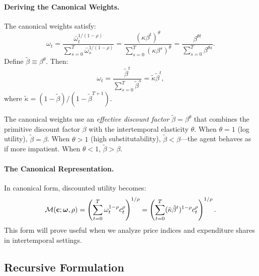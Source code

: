 \paragraph{Deriving the Canonical Weights.}
The canonical weights satisfy:
\begin{equation}
\omega_t = \frac{\bar{\omega}_t^{1/(1-\rho)}}{\sum_{s=0}^{T} \bar{\omega}_s^{1/(1-\rho)}} = \frac{(\kappa \beta^t)^{\theta}}{\sum_{s=0}^{T} (\kappa \beta^s)^{\theta}} = \frac{\beta^{\theta t}}{\sum_{s=0}^{T} \beta^{\theta s}}.
\label{eq:canonical-weights}
\end{equation}
Define $\tilde{\beta} \equiv \beta^\theta$. Then:
\begin{equation}
\omega_t = \frac{\tilde{\beta}^t}{\sum_{s=0}^{T} \tilde{\beta}^s} = \tilde{\kappa} \tilde{\beta}^t,
\label{eq:canonical-weights-simple}
\end{equation}
where $\tilde{\kappa} = (1 - \tilde{\beta})/(1 - \tilde{\beta}^{T+1})$.

\begin{calloutnote}
The canonical weights use an \emph{effective discount factor} $\tilde{\beta} = \beta^\theta$ that combines the primitive discount factor $\beta$ with the intertemporal elasticity $\theta$. When $\theta = 1$ (log utility), $\tilde{\beta} = \beta$. When $\theta > 1$ (high substitutability), $\tilde{\beta} < \beta$---the agent behaves as if more impatient. When $\theta < 1$, $\tilde{\beta} > \beta$.
\end{calloutnote}

\paragraph{The Canonical Representation.}
In canonical form, discounted utility becomes:
\begin{equation}
\mathcal{M}(\mathbf{c}; \boldsymbol{\omega}, \rho) = \left( \sum_{t=0}^{T} \omega_t^{1-\rho} c_t^\rho \right)^{1/\rho} = \left( \sum_{t=0}^{T} (\tilde{\kappa} \tilde{\beta}^t)^{1-\rho} c_t^\rho \right)^{1/\rho}.
\label{eq:canonical-utility}
\end{equation}
This form will prove useful when we analyze price indices and expenditure shares in intertemporal settings.

\subsection{Recursive Formulation}
\label{subsec:recursive-utility}


